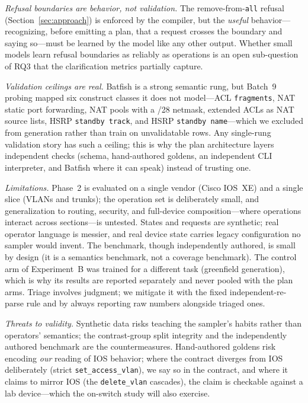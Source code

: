 \documentclass[conference]{IEEEtran}
\begin{document}
\emph{Refusal boundaries are behavior, not validation.} The remove-from-\texttt{all} refusal (Section~\ref{sec:approach}) is enforced by the compiler, but the \emph{useful} behavior---recognizing, before emitting a plan, that a request crosses the boundary and saying so---must be learned by the model like any other output. Whether small models learn refusal boundaries as reliably as operations is an open sub-question of RQ3 that the clarification metrics partially capture.

\emph{Validation ceilings are real.} Batfish is a strong semantic rung, but Batch~9 probing mapped six construct classes it does not model---ACL \texttt{fragments}, NAT static port forwarding, NAT pools with a /28 netmask, extended ACLs as NAT source lists, HSRP \texttt{standby track}, and HSRP \texttt{standby name}---which we excluded from generation rather than train on unvalidatable rows. Any single-rung validation story has such a ceiling; this is why the plan architecture layers independent checks (schema, hand-authored goldens, an independent CLI interpreter, and Batfish where it can speak) instead of trusting one.

\emph{Limitations.} Phase~2 is evaluated on a single vendor (Cisco IOS~XE) and a single slice (VLANs and trunks); the operation set is deliberately small, and generalization to routing, security, and full-device composition---where operations interact across sections---is untested. States and requests are synthetic; real operator language is messier, and real device state carries legacy configuration no sampler would invent. The benchmark, though independently authored, is small by design (it is a semantics benchmark, not a coverage benchmark). The control arm of Experiment~B was trained for a different task (greenfield generation), which is why its results are reported separately and never pooled with the plan arms. Triage involves judgment; we mitigate it with the fixed independent-re-parse rule and by always reporting raw numbers alongside triaged ones.

\emph{Threats to validity.} Synthetic data risks teaching the sampler's habits rather than operators' semantics; the contrast-group split integrity and the independently authored benchmark are the countermeasures. Hand-authored goldens risk encoding \emph{our} reading of IOS behavior; where the contract diverges from IOS deliberately (strict \texttt{set\_access\_vlan}), we say so in the contract, and where it claims to mirror IOS (the \texttt{delete\_vlan} cascades), the claim is checkable against a lab device---which the on-switch study will also exercise.
\end{document}
